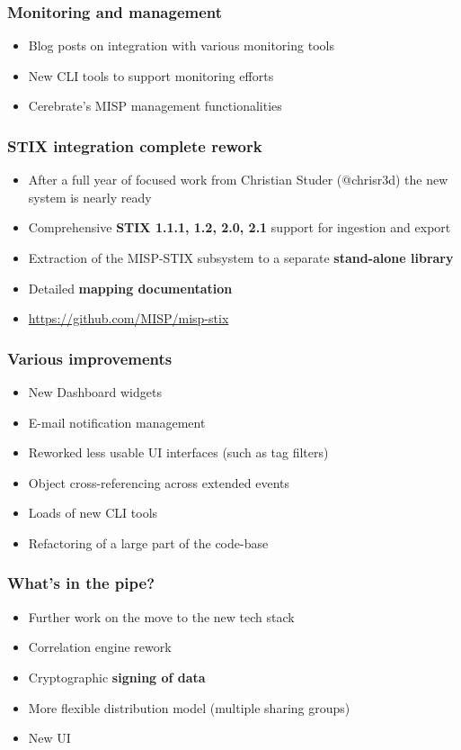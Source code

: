 \begin{frame}
\frametitle{Monitoring and management}
\begin{itemize}
	\item Blog posts on integration with various monitoring tools
        \item New CLI tools to support monitoring efforts
        \item Cerebrate's MISP management functionalities
\end{itemize}
\end{frame}

\begin{frame}
\frametitle{STIX integration complete rework}
\begin{itemize}
	\item After a full year of focused work from Christian Studer (@chrisr3d) the new system is nearly ready
        \item Comprehensive {\bf STIX 1.1.1, 1.2, 2.0, 2.1} support for ingestion and export
        \item Extraction of the MISP-STIX subsystem to a separate {\bf stand-alone library}
        \item Detailed {\bf mapping documentation}
        \item \url{https://github.com/MISP/misp-stix}
\end{itemize}
\end{frame}

\begin{frame}
\frametitle{Various improvements}
\begin{itemize}
	\item New Dashboard widgets
        \item E-mail notification management
        \item Reworked less usable UI interfaces (such as tag filters)
        \item Object cross-referencing across extended events
        \item Loads of new CLI tools
        \item Refactoring of a large part of the code-base
\end{itemize}
\end{frame}


\begin{frame}
\frametitle{What's in the pipe?}
\begin{itemize}
	\item Further work on the move to the new tech stack
        \item Correlation engine rework
        \item Cryptographic {\bf signing of data}
        \item More flexible distribution model (multiple sharing groups)
        \item New UI
\end{itemize}
\end{frame}

